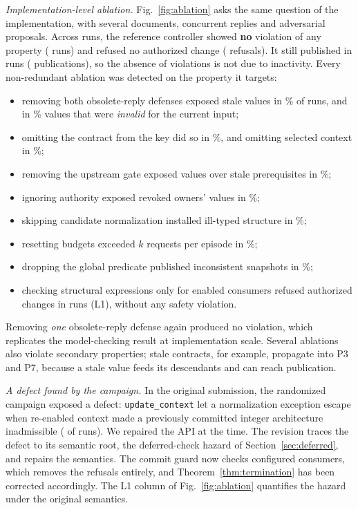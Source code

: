 \emph{Implementation-level ablation.} Fig.~\ref{fig:ablation} asks the same question of the implementation, with several documents, concurrent replies and adversarial proposals. Across \AblRuns{} runs, the reference controller showed \textbf{no} violation of any property (\FullViolRuns{} runs) and refused no authorized change (\FullRefusals{} refusals). It still published in \FullPubRuns{} runs (\FullPublications{} publications), so the absence of violations is not due to inactivity. Every non-redundant ablation was detected on the property it targets:
\begin{itemize}
\item removing both obsolete-reply defenses exposed stale values in \ObsoleteStalePct\% of runs, and in \ObsoleteInvalidPct\% values that were \emph{invalid} for the current input;
\item omitting the contract from the key did so in \ContractStalePct\%, and omitting selected context in \ContextStalePct\%;
\item removing the upstream gate exposed values over stale prerequisites in \UpstreamPct\%;
\item ignoring authority exposed revoked owners' values in \AuthorityPct\%;
\item skipping candidate normalization installed ill-typed structure in \CandidatePct\%;
\item resetting budgets exceeded $k$ requests per episode in \BudgetPct\%;
\item dropping the global predicate published inconsistent snapshots in \GlobalPublishPct\%;
\item checking structural expressions only for enabled consumers refused \EnabledOnlyRefusals{} authorized changes in \EnabledOnlyRuns{} runs (L1), without any safety violation.
\end{itemize}
Removing \emph{one} obsolete-reply defense again produced no violation, which replicates the model-checking result at implementation scale. Several ablations also violate secondary properties; stale contracts, for example, propagate into P3 and P7, because a stale value feeds its descendants and can reach publication.



\emph{A defect found by the campaign.} In the original submission, the randomized campaign exposed a defect: \texttt{update\_context} let a normalization exception escape when re-enabled context made a previously committed integer architecture inadmissible (\PreFixApiRuns{} of \PreFixRuns{} runs). We repaired the API at the time. The revision traces the defect to its semantic root, the deferred-check hazard of Section~\ref{sec:deferred}, and repairs the semantics. The commit guard now checks configured consumers, which removes the refusals entirely, and Theorem~\ref{thm:termination} has been corrected accordingly. The L1 column of Fig.~\ref{fig:ablation} quantifies the hazard under the original semantics.

